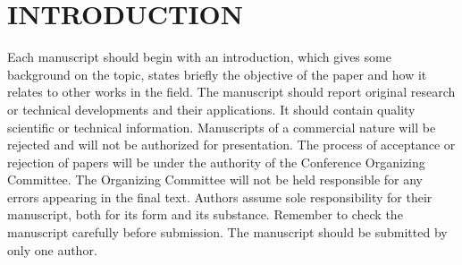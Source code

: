 \section{INTRODUCTION}
\label{sec:introduction}
Each manuscript should begin with an introduction, which gives some background on the topic, states briefly the objective of the paper and how it relates to other works in the field. The manuscript should report original research or technical developments and their applications. It should contain quality scientific or technical information. Manuscripts of a commercial nature will be rejected and will not be authorized for presentation. The process of acceptance or rejection of papers will be under the authority of the Conference Organizing Committee. The Organizing Committee will not be held responsible for any errors appearing in the final text. Authors assume sole responsibility for their manuscript, both for its form and its substance. Remember to check the manuscript carefully before submission. The manuscript should be submitted by only one author.